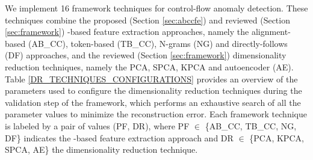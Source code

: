 We implement 16 framework techniques for control-flow anomaly detection. These techniques combine the proposed (Section \ref{sec:abccfe}) and reviewed (Section \ref{sec:framework}) -based feature extraction approaches, namely the alignment-based  (AB\_CC), token-based  (TB\_CC), N-grams (NG) and directly-follows (DF) approaches, and the reviewed (Section \ref{sec:framework}) dimensionality reduction techniques, namely the PCA, SPCA, KPCA and autoencoder (AE). Table \ref{DR_TECHNIQUES_CONFIGURATIONS} provides an overview of the parameters used to configure the dimensionality reduction techniques during the validation step of the framework, which performs an exhaustive search of all the parameter values to minimize the reconstruction error. Each framework technique is labeled by a pair of values (PF, DR), where PF $\in$ \{AB\_CC, TB\_CC, NG, DF\} indicates the -based feature extraction approach and DR $\in$ \{PCA, KPCA, SPCA, AE\} the dimensionality reduction technique.

